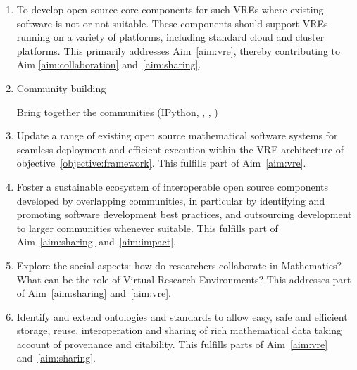 \documentclass[noworkareas,deliverables,gitinfo,compactht]{euproposal}
\begin{document}
\begin{proposal}
\begin{enumerate}
\item\label{objectives:core} To develop open source core components
  for such VREs where existing software is not  or not suitable. These
  components should support VREs running on a variety of
  platforms, including standard cloud and cluster platforms. This primarily
  addresses Aim~\ref{aim:vre}, thereby contributing to Aim
  \ref{aim:collaboration} and~\ref{aim:sharing}.
  




\item \label{objective:community}Community building

  Bring together the communities (IPython, \Sage, \Singular, \GAP)


\item \label{objective:updates} Update a range of existing open source
  mathematical software systems for seamless deployment and efficient
  execution within the VRE architecture of objective~\ref{objective:framework}.
  This fulfills part of Aim~\ref{aim:vre}.



\item \label{objective:sustainable} Foster a sustainable ecosystem of
  interoperable open source components developed by overlapping
  communities, in particular by identifying and promoting software
  development best practices, and outsourcing development to larger
  communities whenever suitable. This fulfills part of
  Aim~\ref{aim:sharing} and~\ref{aim:impact}.


\item \label{objective:social}Explore the social aspects: how do researchers collaborate in
  Mathematics? What can be the role of Virtual Research Environments?
  This addresses part of Aim~\ref{aim:sharing} and~\ref{aim:vre}.

\item \label{objective:data}Identify and extend ontologies and standards to
  allow easy, safe and efficient storage, reuse, interoperation and sharing of rich mathematical
  data taking account of provenance and citability. This fulfills
  parts of Aim~\ref{aim:vre} and~\ref{aim:sharing}.


\end{enumerate}
\end{proposal}
\end{document}
